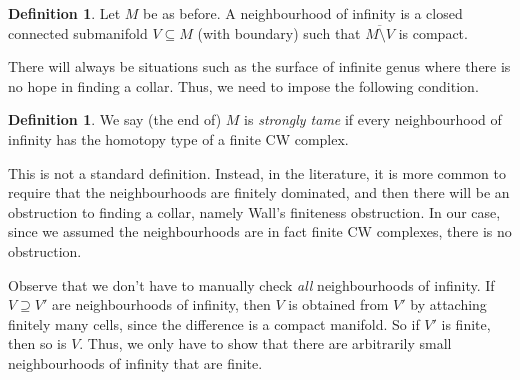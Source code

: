 \documentclass[a4paper, 12pt]{article}
\theoremstyle{definition}
\newtheorem{defi}[thm]{Definition}
\begin{document}
\begin{defi}
  Let $M$ be as before. A neighbourhood of infinity is a closed connected submanifold $V \subseteq M$ (with boundary) such that $\overline{M \setminus V}$ is compact.
\end{defi}

There will always be situations such as the surface of infinite genus where there is no hope in finding a collar. Thus, we need to impose the following condition.
\begin{defi}
  We say (the end of) $M$ is \emph{strongly tame} if every neighbourhood of infinity has the homotopy type of a finite CW complex.
\end{defi}
This is not a standard definition. Instead, in the literature, it is more common to require that the neighbourhoods are finitely dominated, and then there will be an obstruction to finding a collar, namely Wall's finiteness obstruction. In our case, since we assumed the neighbourhoods are in fact finite CW complexes, there is no obstruction.

Observe that we don't have to manually check \emph{all} neighbourhoods of infinity. If $V \supseteq V'$ are neighbourhoods of infinity, then $V$ is obtained from $V'$ by attaching finitely many cells, since the difference is a compact manifold. So if $V'$ is finite, then so is $V$. Thus, we only have to show that there are arbitrarily small neighbourhoods of infinity that are finite.
\end{document}
